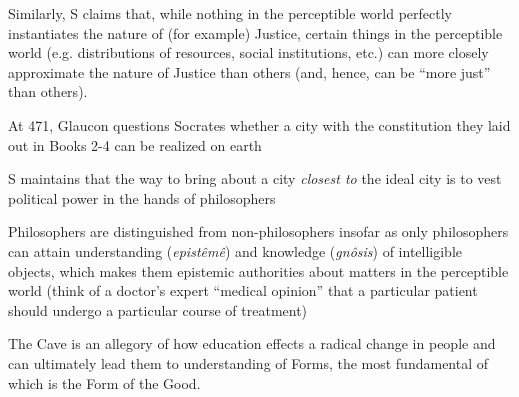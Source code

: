 \documentclass[11pt]{article}
\begin{document}
\noindent Similarly, S claims that, while nothing in the perceptible world perfectly instantiates the nature of (for example) Justice, certain things in the perceptible world (e.g. distributions of resources, social institutions, etc.) can more closely approximate the nature of Justice than others (and, hence, can be ``more just'' than others).

\noindent At 471, Glaucon questions Socrates whether a city with the constitution they laid out in Books 2-4 can be realized on earth
\vspace*{2mm}

\noindent S maintains that the way to bring about a city \emph{closest to} the ideal city is to vest political power in the hands of philosophers
\vspace*{2mm}

\noindent Philosophers are distinguished from non-philosophers insofar as only philosophers can attain understanding (\emph{epist\^{e}m\^{e}}) and knowledge (\emph{gn\^{o}sis}) of intelligible objects, which makes them epistemic authorities about matters in the perceptible world (think of a doctor's expert ``medical opinion'' that a particular patient should undergo a particular course of treatment)
\vspace*{2mm}

\noindent The Cave is an allegory of how education effects a radical change in people and can ultimately lead them to understanding of Forms, the most fundamental of which is the Form of the Good.
\end{document}
